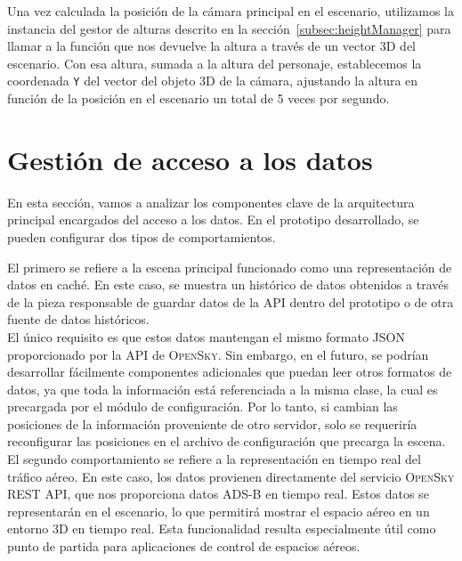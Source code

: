 \documentclass[a4paper, 11pt]{book}
\begin{document}
Una vez calculada la posición de la cámara principal en el escenario, utilizamos la instancia del gestor de alturas descrito en la sección~\ref{subsec:heightManager} para llamar a la función que nos devuelve la altura a través de un vector 3D del escenario. Con esa altura, sumada a la altura del personaje, establecemos la coordenada \texttt{Y} del vector del objeto \textsc{3D} de la cámara, ajustando la altura en función de la posición en el escenario un total de 5 veces por segundo.

\section{Gestión de acceso a los datos}
\label{sec:data}
En esta sección, vamos a analizar los componentes clave de la arquitectura principal encargados del acceso a los datos. En el prototipo desarrollado, se pueden configurar dos tipos de comportamientos.

El primero se refiere a la escena principal funcionado como una representación de datos en caché. En este caso, se muestra un histórico de datos obtenidos a través de la pieza responsable de guardar datos de la \textsc{API} dentro del prototipo o de otra fuente de datos históricos. \\
El único requisito es que estos datos mantengan el mismo formato \textsc{JSON} proporcionado por la \textsc{API} de \textsc{OpenSky}. Sin embargo, en el futuro, se podrían desarrollar fácilmente componentes adicionales que puedan leer otros formatos de datos, ya que toda la información está referenciada a la misma clase, la cual es precargada por el módulo de configuración. Por lo tanto, si cambian las posiciones de la información proveniente de otro servidor, solo se requeriría reconfigurar las posiciones en el archivo de configuración que precarga la escena.\\

El segundo comportamiento se refiere a la representación en tiempo real del tráfico aéreo. En este caso, los datos provienen directamente del servicio\textsc{ OpenSky REST API}, que nos proporciona datos \textsc{ADS-B} en tiempo real. Estos datos se representarán en el escenario, lo que permitirá mostrar el espacio aéreo en un entorno \textsc{3D} en tiempo real. Esta funcionalidad resulta especialmente útil como punto de partida para aplicaciones de control de espacios aéreos.
\end{document}

